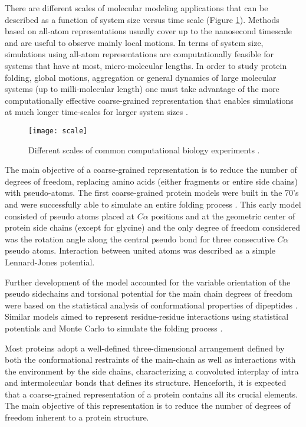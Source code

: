 \documentclass[
	12pt,				%
	openright,			%
	twoside,			%
	a4paper,			%
	english,			%
	french,				%
	spanish,			%
	brazil,				%
	]{abntex2}
\begin{document}
There are different scales of  molecular modeling applications that can be described as a function of system size versus time scale (Figure \ref{fig:scale}). Methods based on all-atom representations usually cover up to the nanosecond timescale and are useful to observe mainly local motions. In terms of system size, simulations using all-atom representations are computationally feasible for systems that have at most, micro-molecular lengths. In order to study protein folding, global motions, aggregation or general dynamics of large molecular systems (up to milli-molecular length) one must take advantage of the more computationally effective coarse-grained representation that enables simulations at much longer time-scales for larger system sizes \cite{Kmiecik2016}.

\begin{figure}
	\centering
	\texttt{[image: scale]}
	\caption{Different scales of common computational biology experiments \cite{Kmiecik2016}.}
	\label{fig:scale}
\end{figure}

The main objective of a coarse-grained representation is to reduce the number of degrees of freedom, replacing amino acids (either fragments or entire side chains) with pseudo-atoms. The first coarse-grained protein models were built in the 70's and were successfully able to simulate an entire folding process \cite{Levitt1975}. This early model consisted of pseudo atoms placed at $C\alpha$ positions and at the geometric center of protein side chains (except for glycine) and the only degree of freedom considered was the rotation angle along the central pseudo bond for three consecutive $C\alpha$ pseudo atoms. Interaction between united atoms was described as a simple Lennard-Jones potential.

Further development of the model accounted for the variable orientation of the pseudo sidechains and torsional potential for the main chain degrees of freedom were based on the statistical analysis of conformational properties of dipeptides \cite{Levitt1976}. Similar models aimed to represent residue-residue interactions using statistical potentials and Monte Carlo to simulate the folding process \cite{Wilson1989}.

Most proteins adopt a well-defined three-dimensional arrangement defined by both the conformational restraints of the main-chain as well as interactions with the environment by the side chains, characterizing a convoluted interplay of intra and intermolecular bonds that defines its structure. Henceforth, it is expected that a coarse-grained representation of a protein contains all its crucial elements. The main objective of this representation is to reduce the number of degrees of freedom inherent to a protein structure. 
\end{document}
